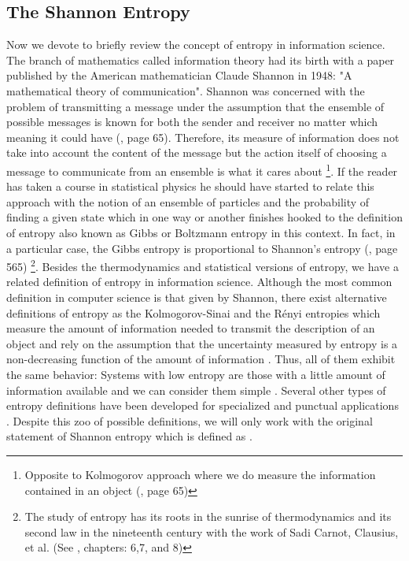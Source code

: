 \subsection{The Shannon Entropy}
Now we devote to briefly review the concept of entropy in information science. The branch of mathematics called information theory had its birth with a paper published by the American mathematician Claude Shannon in 1948: "A mathematical theory of communication"\cite{shannon}. Shannon was concerned with the problem of transmitting a message under the assumption that the ensemble of possible messages is known for both the sender and receiver no matter which meaning it could have (\cite{kolmo_book}, page 65). Therefore, its measure of information does not take into account the content of the message but the action itself of choosing a message to communicate from an ensemble is what it cares about \footnote{Opposite to Kolmogorov approach where we do measure the information contained in an object (\cite{kolmo_book}, page 65)}. If the reader has taken a course in statistical physics he should have started to relate this approach with the notion of an ensemble of particles and the probability of finding a given state which in one way or another finishes hooked to the definition of entropy also known as Gibbs or Boltzmann entropy in this context. In fact, in a particular case, the Gibbs entropy is proportional to Shannon's entropy (\cite{kolmo_book}, page 565) \footnote{The study of entropy has its roots in the sunrise of thermodynamics and its second law in the nineteenth century with the work of Sadi Carnot, Clausius, et al. (See \cite{termo}, chapters: 6,7, and 8)}. Besides the thermodynamics and statistical versions of entropy, we have a related definition of entropy in information science. Although the most common definition in computer science is that given by Shannon, there exist alternative definitions of entropy as the Kolmogorov-Sinai and the Rényi entropies which measure the amount of information needed to transmit the description of an object and rely on the assumption that the uncertainty measured by entropy is a non-decreasing function of the amount of information \cite{kolmo_graph}. Thus, all of them exhibit the same behavior: Systems with low entropy are those with a little amount of information available and we can consider them simple \cite{kolmo_graph}. Several other types of entropy definitions have been developed for specialized and punctual applications \cite{kolmo_graph}. Despite this zoo of possible definitions, we will only work with the original statement of Shannon entropy which is defined as \cite{info_theory}.


